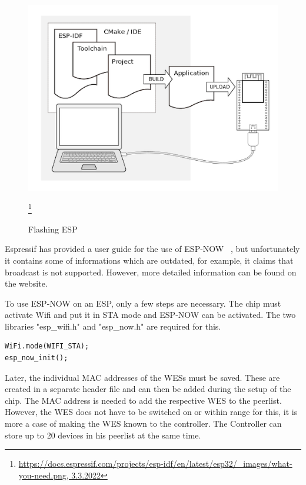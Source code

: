 \begin{figure}[h]
	\centering
	\includegraphics[scale=0.4]{figures/ESP-ISF.png}
	\caption{Flashing ESP}
	\label{fig:ESP-IDF}
	\footnote{\url{https://docs.espressif.com/projects/esp-idf/en/latest/esp32/_images/what-you-need.png, 3.3.2022}}
\end{figure}

Espressif has provided a user guide for the use of ESP-NOW ~\cite{ESPNOWGuide},
but unfortunately it contains some of informations which are outdated, 
for example, it claims that broadcast is not supported.
However, more detailed information can be found on the website.

To use ESP-NOW on an ESP, only a few steps are necessary.
The chip must activate Wifi and put it in STA mode and ESP-NOW can be activated.
The two libraries "esp\_wifi.h" and "esp\_now.h" are required for this.

\begin{lstlisting}[caption=Init ESP-NOW]
WiFi.mode(WIFI_STA);
esp_now_init();
\end{lstlisting}
\label{lst:init}

Later, the individual MAC addresses of the WESs must be saved.
These are created in a separate header file and can then be added during the setup of the chip.
The MAC address is needed to add the respective WES to the peerlist.
However, the WES does not have to be switched on or within range for this, it is more a case of making the WES known to the controller.
The Controller can store up to 20 devices in his peerlist at the same time.

